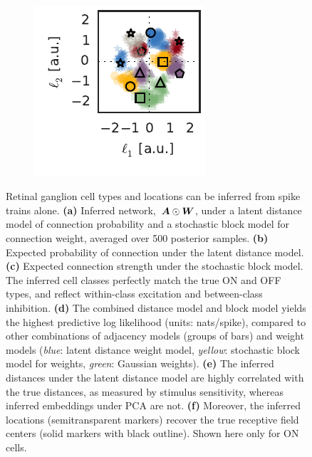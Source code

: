 \begin{figure}[t!]
\begin{subfigure}[b]{1.6in}
    \label{fig:rgc_dist}
  \end{subfigure}
  ~
  \begin{subfigure}[b]{1.6in}
    \centering
    \caption{}
    \vspace{-.2in}
    \includegraphics[width=\textwidth]{figures/ch3/rgc_on_locations.pdf}
    \label{fig:rgc_locs}
  \end{subfigure}
  \vspace{-2em}
  \caption{Retinal ganglion cell types and locations can be inferred
    from spike trains alone.
    \textbf{(a)} Inferred network,~${\boldsymbol{A} \odot \boldsymbol{W}}$, under a latent distance model of connection probability and a stochastic block model for connection weight, averaged over 500 posterior samples.
    \textbf{(b)} Expected probability of connection under the latent distance model.
    \textbf{(c)} Expected connection strength under the stochastic block model. The inferred cell classes perfectly match the true ON and OFF types, and reflect within-class excitation and between-class inhibition.
    \textbf{(d)} The combined distance model and block model yields the highest predictive log likelihood (units: nats/spike), compared to other combinations of adjacency models (groups of bars) and weight models (\textit{blue}: latent distance weight model, \textit{yellow}: stochastic block model for weights, \textit{green}: Gaussian weights).
    \textbf{(e)} The inferred distances under the latent distance model are highly correlated with the true distances, as measured by stimulus sensitivity, whereas inferred embeddings under PCA are not.
    \textbf{(f)} Moreover, the inferred locations (semitransparent markers) recover the true receptive field centers (solid markers with black outline). Shown here only for ON cells.}
  \label{fig:rgc}
\end{figure}

